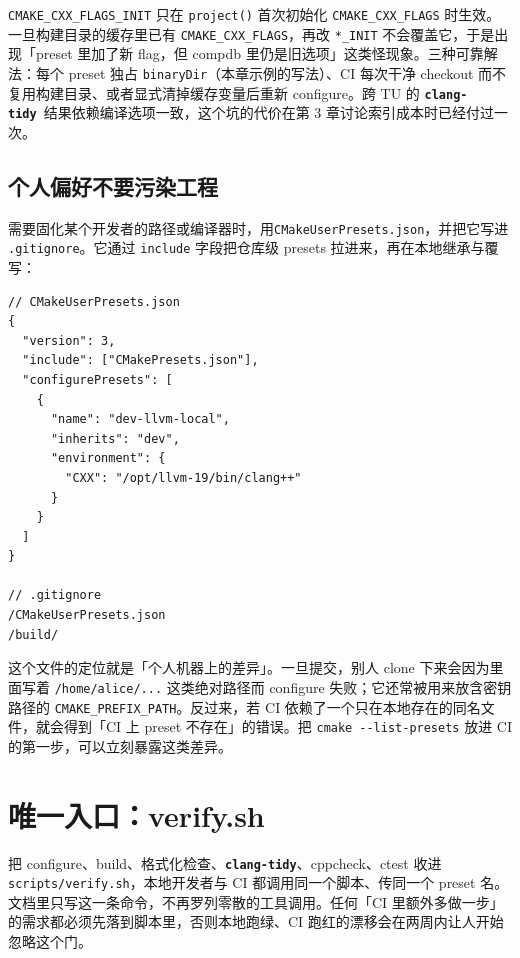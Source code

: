 \documentclass[12pt,a4paper,fontset=fandol]{ctexbook}
\newcommand{\Opt}[1]{\texttt{-\/-#1}}
\newcommand{\Bk}{\discretionary{}{}{}}
\newcommand{\Lib}[1]{\textbf{\texttt{#1}}}
\newcommand{\Tidy}{\Lib{clang-tidy}}
\begin{document}
\texttt{CMAKE\_CXX\_FLAGS\_INIT} 只在 \texttt{project()} 首次初始化 \texttt{CMAKE\_CXX\_FLAGS} 时生效。一旦构建目录的缓存里已有 \texttt{CMAKE\_CXX\_FLAGS}，再改 \texttt{*\_INIT} 不会覆盖它，于是出现「preset 里加了新 flag，但 compdb 里仍是旧选项」这类怪现象。三种可靠解法：每个 preset 独占 \texttt{binaryDir}（本章示例的写法）、CI 每次干净 checkout 而不复用构建目录、或者显式清掉缓存变量后重新 configure。跨 TU 的 \Tidy\ 结果依赖编译选项一致，这个坑的代价在第 3 章讨论索引成本时已经付过一次。

\subsection{个人偏好不要污染工程}\label{sec:ch16-s6}

需要固化某个开发者的路径或编译器时，用\texttt{CMakeUserPresets.json}，并把它写进 \texttt{.gitignore}。它通过 \texttt{include} 字段把仓库级 presets 拉进来，再在本地继承与覆写：

\begin{lstlisting}[style=jsonstyle,caption={CMakeUserPresets.json 与 .gitignore 的配合},label={lst:ch16-user}]
// CMakeUserPresets.json
{
  "version": 3,
  "include": ["CMakePresets.json"],
  "configurePresets": [
    {
      "name": "dev-llvm-local",
      "inherits": "dev",
      "environment": {
        "CXX": "/opt/llvm-19/bin/clang++"
      }
    }
  ]
}

// .gitignore
/CMakeUserPresets.json
/build/
\end{lstlisting}

\begin{warning}[title={CMakeUserPresets.json 不能提交}]
这个文件的定位就是「个人机器上的差异」。一旦提交，别人 clone 下来会因为里面写着 \texttt{/home/alice/...} 这类绝对路径而 configure 失败；它还常被用来放含密钥路径的 \texttt{CMAKE\_PREFIX\_PATH}。反过来，若 CI 依赖了一个只在本地存在的同名文件，就会得到「CI 上 preset 不存在」的错误。把 \texttt{cmake}~\Opt{list-presets} 放进 CI 的第一步，可以立刻暴露这类差异。
\end{warning}

\section{唯一入口：verify.sh}\label{sec:ch16-s7}

\begin{bestpractice}[title={一个仓库只允许一个质量门入口脚本}]
把 configure、build、格式化检查、\Tidy、cppcheck、ctest 收进\texttt{scripts/{\Bk}verify.sh}，本地开发者与 CI 都调用同一个脚本、传同一个 preset 名。文档里只写这一条命令，不再罗列零散的工具调用。任何「CI 里额外多做一步」的需求都必须先落到脚本里，否则本地跑绿、CI 跑红的漂移会在两周内让人开始忽略这个门。
\end{bestpractice}
\end{document}
